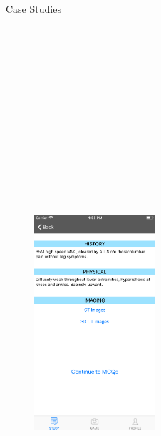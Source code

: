 \documentclass[final]{beamer}
\newlength{\onecolwid}
\begin{document}
\begin{frame}[t] %
\begin{columns}[t] %



\begin{column}{\onecolwid} %



\begin{block}{\LARGE Case Studies}

\begin{figure}
\centering
\includegraphics[width=0.4\textwidth, height=22cm]{cases.png}


\end{figure}
\end{block}
\end{column}
\end{columns}
\end{frame}
\end{document}
